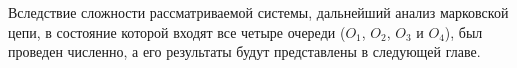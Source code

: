 Вследствие сложности рассматриваемой системы, дальнейший анализ марковской цепи, в состояние которой входят все четыре очереди ($O_1$, $O_2$, $O_3$ и $O_4$), был проведен численно, а его результаты будут представлены в следующей главе.





















































